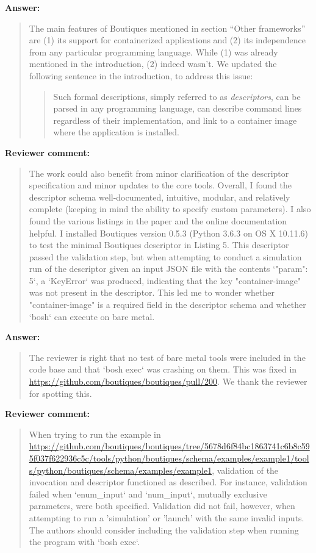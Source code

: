 \documentclass[a4]{article}
\newenvironment{review}%
{\textbf{Reviewer comment:}\begin{quote}}%
{\end{quote}}%
\newenvironment{answer}%
{\textbf{Answer:}\begin{quote}}%
{\end{quote}}%
\begin{document}
\begin{answer}
The main features of Boutiques mentioned in section ``Other
frameworks'' are (1) its support for containerized applications and
(2) its independence from any particular programming language. While
(1) was already mentioned in the introduction, (2) indeed wasn't. We
updated the following sentence in the introduction, to address this
issue:

\begin{quote}
  Such formal descriptions, simply referred
to as \emph{descriptors}, \color{blue}can be parsed in any programming language,
can describe command lines regardless of their implementation,\color{black}
and link to a container image where the application is
installed.
\end{quote}

\end{answer}

\begin{review}
The work could also benefit from minor clarification of the descriptor
specification and minor updates to the core tools. Overall, I found
the descriptor schema well-documented, intuitive, modular, and
relatively complete (keeping in mind the ability to specify custom
parameters). I also found the various listings in the paper and the
online documentation helpful. I installed Boutiques version 0.5.3
(Python 3.6.3 on OS X 10.11.6) to test the minimal Boutiques
descriptor in Listing 5. This descriptor passed the validation step,
but when attempting to conduct a simulation run of the descriptor
given an input JSON file with the contents `{"param": 5}`, a
`KeyError` was produced, indicating that the key "container-image" was
not present in the descriptor. This led me to wonder whether
"container-image" is a required field in the descriptor schema and
whether `bosh` can execute on bare metal.
\end{review}

\begin{answer}
  The reviewer is right that no test of bare metal tools were included
  in the code base and that `bosh exec` was crashing on them. This was
  fixed in \url{https://github.com/boutiques/boutiques/pull/200}. We
  thank the reviewer for spotting this.
\end{answer}


\begin{review}
When trying to run the example in
\url{https://github.com/boutiques/boutiques/tree/5678d6f84bc1863741c6b8c595f037f622936c5c/tools/python/boutiques/schema/examples/example1/tools/python/boutiques/schema/examples/example1},
validation of the invocation and descriptor functioned as
described. For instance, validation failed when `enum\_input` and
`num\_input`, mutually exclusive parameters, were both
specified. Validation did not fail, however, when attempting to run a
'simulation' or 'launch' with the same invalid inputs. The authors
should consider including the validation step when running the program
with `bosh exec`.
\end{review}
\end{document}
